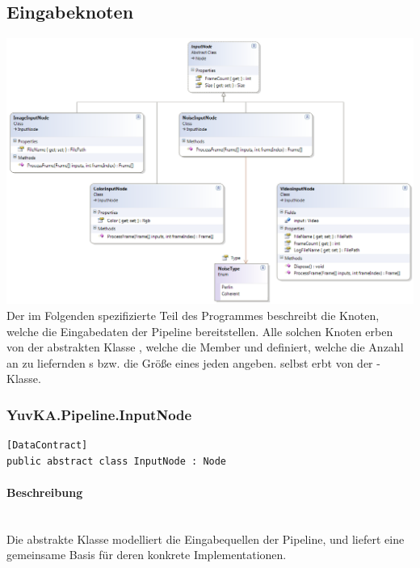 \subsection{Eingabeknoten}

\includegraphics[width=\textwidth]{YuvKA.Pipeline/inputnodes.png}
Der im Folgenden spezifizierte Teil des Programmes beschreibt die Knoten, welche die Eingabedaten der Pipeline bereitstellen. Alle solchen Knoten erben von der abstrakten Klasse , welche die Member  und  definiert, welche die Anzahl an zu liefernden s bzw. die Größe eines jeden  angeben.
 selbst erbt von der -Klasse.


\subsubsection{YuvKA.Pipeline.InputNode}

\begin{verbatim}
[DataContract]
public abstract class InputNode : Node
\end{verbatim}

\paragraph{Beschreibung}~\\
Die abstrakte Klasse  modelliert die Eingabequellen der Pipeline, und liefert eine gemeinsame Basis für deren konkrete Implementationen.

